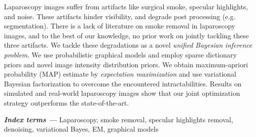\begin{Abstract}
Laparoscopy images suffer from artifacts like surgical smoke, specular highlights, and noise. These artifacts hinder visibility, and degrade post processing (e.g. segmentation). There is a lack of literature on smoke removal in laparoscopy images, and to the best of our knowledge, no prior work on jointly tackling these three artifacts. We tackle these degradations as a novel \emph{unified Bayesian inference problem}. We use probabilistic graphical models and employ sparse dictionary priors and novel image intensity distribution priors. We obtain maximum-apriori probability (MAP) estimate by \emph{expectation maximization} and use variational Bayesian factorization to overcome the encountered intractabilities. Results on simulated and real-world laparoscopy images show that our joint optimization strategy outperforms the state-of-the-art.

\textbf{\textit{Index terms ---}} Laparoscopy, smoke removal, specular highlights removal, denoising, variational Bayes, EM, graphical models
%
%
%
%
%
\end{Abstract}

